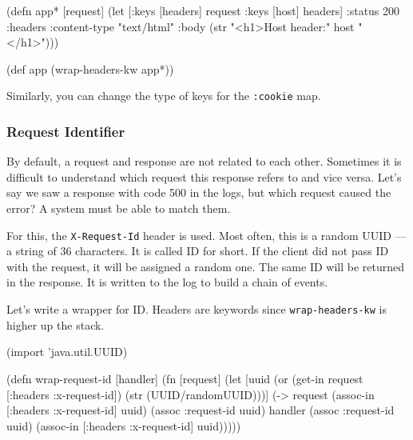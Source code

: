 \ifx\DEVICETYPE\MOBILE

\begin{clojure}
(defn app* [request]
  (let [{:keys [headers]} request
        {:keys [host]} headers]
    {:status 200
     :headers {:content-type "text/html"}
     :body (str "<h1>Host header:" host
                "</h1>")}))

(def app (wrap-headers-kw app*))
\end{clojure}

\else


\fi

Similarly, you can change the type of keys for the \verb|:cookie| map.

\subsubsection*{Request Identifier}


By default, a request and response are not related to each other. Sometimes it is difficult to understand which request this response refers to and vice versa. Let's say we saw a response with code 500 in the logs, but which request caused the error? A system must be able to match them.

For this, the \verb|X-Request-Id| header is used. Most often, this is a random UUID — a string of 36 characters. It is called ID for short. If the client did not pass ID with the request, it will be assigned a random one. The same ID will be returned in the response. It is written to the log to build a chain of events.


Let's write a wrapper for ID. Headers are keywords since \verb|wrap-headers-kw| is higher up the stack.

\ifx\DEVICETYPE\MOBILE

\begin{clojure}
(import 'java.util.UUID)

(defn wrap-request-id [handler]
  (fn [request]
    (let [uuid (or
                (get-in request
                        [:headers
                         :x-request-id])
                (str
                  (UUID/randomUUID)))]
      (-> request
          (assoc-in [:headers
                     :x-request-id] uuid)
          (assoc :request-id uuid)
          handler
          (assoc :request-id uuid)
          (assoc-in [:headers
                     :x-request-id]
                    uuid)))))
\end{clojure}

